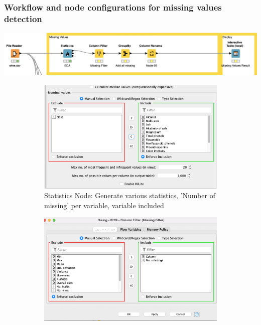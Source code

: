 \documentclass[11pt]{article}
\begin{document}
			\subsubsection*{Workflow and node configurations for missing values detection}
			\iftrue
			\begin{center}
				\includegraphics[scale=0.5]{res/t0/t01/t01-workflow}
			\end{center}
			\fi
			\iftrue
			\begin{figure}[H]
				\centering
				\begin{subfigure}{0.4\textwidth}
					\includegraphics[width=\textwidth]{res/t0/t01/t01-statistics-conf}
					\caption{Statistics Node: Generate various statistics, 'Number of missing' per variable, variable included}
					\label{fig:first}
				\end{subfigure}
				\hfill
				\begin{subfigure}{0.4\textwidth}
					\includegraphics[width=\textwidth]{res/t0/t01/t01-column-filter-conf}

\end{subfigure}
\end{figure}
\end{document}
